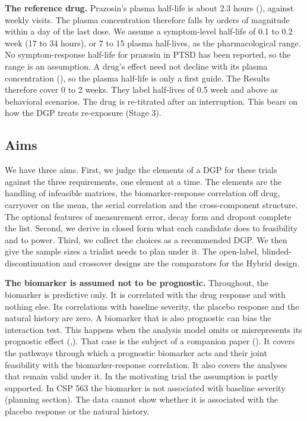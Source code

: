 \documentclass[
  11pt,
]{article}
\begin{document}
\textbf{The reference drug.} Prazosin's plasma half-life is about 2.3 hours
(), against weekly visits. The plasma concentration
therefore falls by orders of magnitude within a day of the last dose.
We assume a symptom-level half-life of 0.1 to 0.2 week (17 to 34
hours), or 7 to 15 plasma half-lives, as the pharmacological range.
No symptom-response half-life for prazosin in PTSD has been reported,
so the range is an assumption. A drug's effect need not decline with
its plasma concentration (), so the plasma half-life
is only a first guide. The Results therefore cover 0 to 2 weeks. They
label half-lives of 0.5 week and above as behavioral scenarios. The
drug is re-titrated after an interruption. This bears on how the DGP
treats re-exposure (Stage 3).

\subsection{Aims}\label{aims}

We have three aims. First, we judge the elements of a DGP for these
trials against the three requirements, one element at a time. The
elements are the handling of infeasible matrices, the
biomarker-response correlation off drug, carryover on the mean, the
serial correlation and the cross-component structure. The optional
features of measurement error, decay form and dropout complete the
list. Second, we derive in closed form what each candidate does to
feasibility and to power. Third, we collect the choices as a
recommended DGP. We then give the sample sizes a trialist needs to
plan under it. The open-label, blinded-discontinuation and crossover
designs are the comparators for the Hybrid design.

\textbf{The biomarker is assumed not to be prognostic.} Throughout, the
biomarker is predictive only. It is correlated with the drug response
and with nothing else. Its correlations with baseline severity, the
placebo response and the natural history are zero. A biomarker that is
also prognostic can bias the interaction test. This happens when the
analysis model omits or misrepresents its prognostic effect
(,). That case is the subject of a companion
paper (). It covers the pathways through which a
prognostic biomarker acts and their joint feasibility with the
biomarker-response correlation. It also covers the analyses that
remain valid under it. In the motivating trial the assumption is
partly supported. In CSP 563 the biomarker is not associated with
baseline severity (planning section). The data cannot
show whether it is associated with the placebo response or the
natural history.
\end{document}
